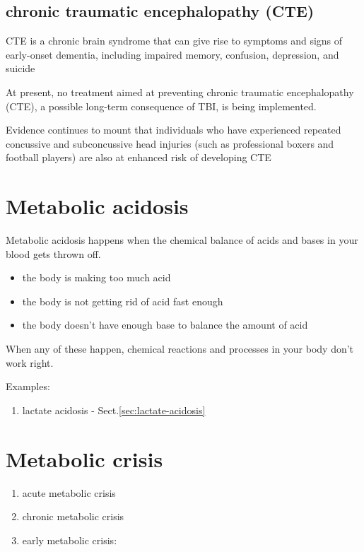 \subsection{chronic traumatic encephalopathy (CTE)}
\label{sec:CTE-chronic-traumatic-encephalopathy}

CTE is a chronic brain syndrome that can give rise to symptoms and signs of
early-onset dementia, including impaired memory, confusion, depression, and
suicide

At present, no treatment aimed at preventing chronic traumatic encephalopathy
(CTE), a possible long-term consequence of TBI, is being implemented.

Evidence continues to mount that individuals who have experienced repeated
concussive and subconcussive head injuries (such as professional boxers and
football players) are also at enhanced risk of developing CTE




\section{Metabolic acidosis}
\label{sec:metabolic-acidosis}

Metabolic acidosis happens when the chemical balance of acids and bases in your
blood gets thrown off.
\begin{itemize}
  \item the body is making too much acid
  \item the body is not getting rid of acid fast enough
  \item the body doesn't have enough base to balance the amount of acid
\end{itemize}
When any of these happen, chemical reactions and processes in your body don't
work right.

Examples:
\begin{enumerate}
  \item lactate acidosis - Sect.\ref{sec:lactate-acidosis}
\end{enumerate}

\section{Metabolic crisis}
\label{sec:metabolic-crisis}

\begin{enumerate}
  \item acute metabolic crisis
  \item chronic metabolic crisis

  \item early metabolic crisis:
\end{enumerate}

